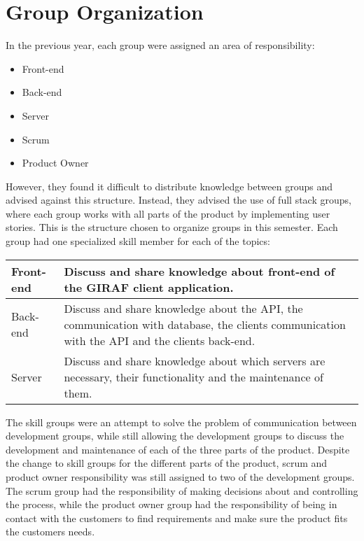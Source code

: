 \section{Group Organization}
In the previous year, each group were assigned an area of responsibility:
\begin{itemize}
    \item Front-end
    \item Back-end
    \item Server
    \item Scrum
    \item Product Owner
\end{itemize}

However, they found it difficult to distribute knowledge between groups and advised against this structure. Instead, they advised the use of full stack groups, where each group works with all parts of the product by implementing user stories. This is the structure chosen to organize groups in this semester. Each group had one specialized skill member for each of the topics: 

\begin{table}[htbp]
\begin{tabularx}{\textwidth}{l|X}
\hline
 Front-end  & Discuss and share knowledge about front-end of the GIRAF client application.  \\ \hline
 Back-end   & Discuss and share knowledge about the API, the communication with database, the clients communication with the API and the clients back-end.   \\ \hline
 Server     & Discuss and share knowledge about which servers are necessary, their functionality and the maintenance of them.\\ \hline
\end{tabularx}
\end{table}

The skill groups were an attempt to solve the problem of communication between development groups, while still allowing the development groups to discuss the development and maintenance of each of the three parts of the product.
Despite the change to skill groups for the different parts of the product, scrum and product owner responsibility was still assigned to two of the development groups. The scrum group had the responsibility of making decisions about and controlling the process, while the product owner group had the responsibility of being in contact with the customers to find requirements and make sure the product fits the customers needs.